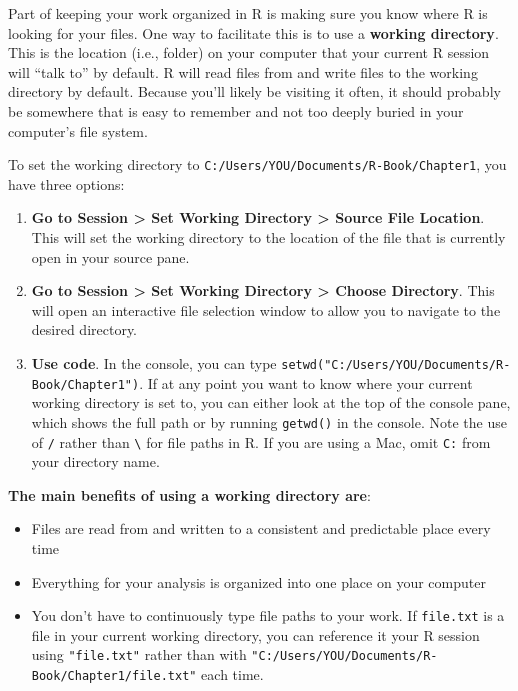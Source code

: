 \documentclass[]{book}
\providecommand{\tightlist}{%
  \setlength{\itemsep}{0pt}\setlength{\parskip}{0pt}}
\begin{document}
Part of keeping your work organized in R is making sure you know where R is looking for your files. One way to facilitate this is to use a \textbf{working directory}. This is the location (i.e., folder) on your computer that your current R session will ``talk to'' by default. R will read files from and write files to the working directory by default. Because you'll likely be visiting it often, it should probably be somewhere that is easy to remember and not too deeply buried in your computer's file system.

To set the working directory to \texttt{C:/Users/YOU/Documents/R-Book/Chapter1}, you have three options:

\begin{enumerate}
\def\labelenumi{\arabic{enumi}.}
\item
  \textbf{Go to Session \textgreater{} Set Working Directory \textgreater{} Source File Location}. This will set the working directory to the location of the file that is currently open in your source pane.
\item
  \textbf{Go to Session \textgreater{} Set Working Directory \textgreater{} Choose Directory}. This will open an interactive file selection window to allow you to navigate to the desired directory.
\item
  \textbf{Use code}. In the console, you can type \texttt{setwd("C:/Users/YOU/Documents/R-Book/Chapter1")}. If at any point you want to know where your current working directory is set to, you can either look at the top of the console pane, which shows the full path or by running \texttt{getwd()} in the console. Note the use of \texttt{/} rather than \texttt{\textbackslash{}} for file paths in R. If you are using a Mac, omit \texttt{C:} from your directory name.
\end{enumerate}

\textbf{The main benefits of using a working directory are}:

\begin{itemize}
\tightlist
\item
  Files are read from and written to a consistent and predictable place every time
\item
  Everything for your analysis is organized into one place on your computer
\item
  You don't have to continuously type file paths to your work. If \texttt{file.txt} is a file in your current working directory, you can reference it your R session using \texttt{"file.txt"} rather than with \texttt{"C:/Users/YOU/Documents/R-Book/Chapter1/file.txt"} each time.
\end{itemize}
\end{document}
